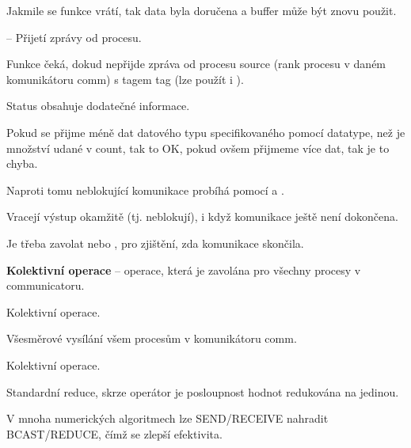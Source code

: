 \begin{compactitem}
\begin{compactitem}
        \item Jakmile se funkce vrátí, tak data byla doručena a buffer může být znovu použit.
    \end{compactitem}

    \item {} -- Přijetí zprávy od procesu. \begin{compactitem}
        \item Funkce čeká, dokud nepřijde zpráva od procesu source (rank procesu v daném komunikátoru comm) s tagem tag (lze použít i ).
        \item Status obsahuje dodatečné informace.
        \item Pokud se přijme méně dat datového typu specifikovaného pomocí datatype, než je množství udané v count, tak to OK, pokud ovšem přijmeme více dat, tak je to chyba.
    \end{compactitem}

    \item Naproti tomu neblokující komunikace probíhá pomocí  a . \begin{compactitem}
        \item Vracejí výstup okamžitě (tj. neblokují), i když komunikace ještě není dokončena.
        \item Je třeba zavolat  nebo , pro zjištění, zda komunikace skončila.
    \end{compactitem}

    \item \textbf{Kolektivní operace} -- operace, která je zavolána pro všechny procesy v communicatoru.

    \item {} \begin{compactitem}
        \item Kolektivní operace.
        \item Všesměrové vysílání všem procesům v komunikátoru comm.
    \end{compactitem}

    \item {} \begin{compactitem}
        \item Kolektivní operace.
        \item Standardní reduce, skrze operátor je posloupnost hodnot redukována na jedinou.
        \item V mnoha numerických algoritmech lze SEND/RECEIVE nahradit BCAST/REDUCE, čímž se zlepší efektivita.
    \end{compactitem}


\end{compactitem}
